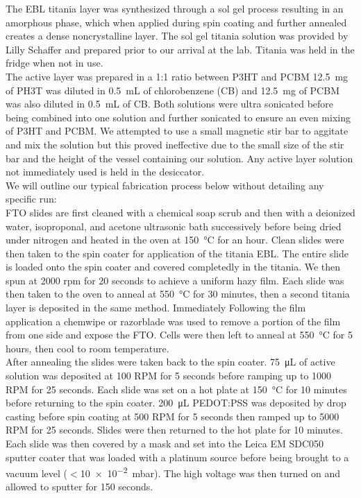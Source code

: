 	The EBL titania layer was synthesized through a sol gel process resulting in an amorphous phase, which when applied during spin coating and further annealed creates a dense noncrystalline layer. The sol gel titania solution was provided by Lilly Schaffer and prepared prior to our arrival at the lab. Titania was held in the fridge when not in use.\\
	
	The active layer was prepared in a 1:1 ratio between P3HT and PCBM\cite{P3HTPCBM} \SI{12.5}{\milli\gram} of PH3T was diluted in \SI{0.5}{\milli\liter} of chlorobenzene (CB) and \SI{12.5}{\milli\gram} of PCBM was also diluted in \SI{0.5}{\milli\liter} of CB. Both solutions were ultra sonicated before being combined into one solution and further sonicated to ensure an even mixing of P3HT and PCBM. We attempted to use a small magnetic stir bar to aggitate and mix the solution but this proved ineffective due to the small size of the stir bar and the height of the vessel containing our solution. Any active layer solution not immediately used is held in the desiccator. \\
	
	We will outline our typical fabrication process below without detailing any specific run:\\
	
	FTO slides are first cleaned with a chemical soap scrub and then with a deionized water, isoproponal, and acetone ultrasonic bath successively before being dried under nitrogen and heated in the oven at \SI{150}{\celsius} for an hour. Clean slides were then taken to the spin coater for application of the titania EBL. The entire slide is loaded onto the spin coater and covered completedly in the titania. We then spun at 2000 rpm for 20 seconds to achieve a uniform hazy film. Each slide was then taken to the oven to anneal at \SI{550}{\celsius} for 30 minutes, then a second titania layer is deposited in the same method. Immediately Following the film application a chemwipe or razorblade was used to remove a portion of the film from one side and expose the FTO. Cells were then left to anneal at \SI{550}{\celsius} for 5 hours, then cool to room temperature. \\
	
	After annealing the slides were taken back to the spin coater. \SI{75}{\micro\liter} of active solution was deposited at 100 RPM for 5 seconds before ramping up to 1000 RPM for 25 seconds. Each slide was set on a hot plate at \SI{150}{\celsius} for 10 minutes before returning to the spin coater. \SI{200}{\micro\liter} PEDOT:PSS was deposited by drop casting before spin coating at 500 RPM for 5 seconds then ramped up to 5000 RPM for 25 seconds. Slides were then returned to the hot plate for 10 minutes. Each slide was then covered by a mask and set into the Leica EM SDC050 sputter coater that was loaded with a platinum source before being brought to a vacuum level ($<$\SI{10e-2}{\milli\bar}). The high voltage was then turned on and allowed to sputter for 150 seconds. \\
	
	
